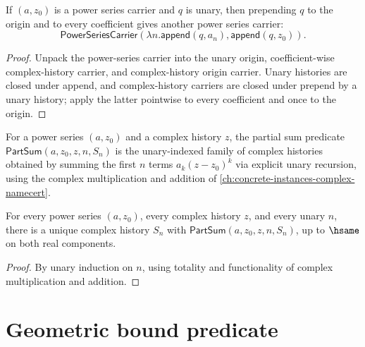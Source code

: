 \begin{lemma}
\label{thm:power-series-carrier-prepend-unary-closed}
If $(a,z_0)$ is a power series carrier and $q$ is unary, then prepending $q$ to
the origin and to every coefficient gives another power series carrier:
$$
\mathsf{PowerSeriesCarrier}(\lambda n.\mathsf{append}(q,a_n),\mathsf{append}(q,z_0)).
$$
\end{lemma}
\begin{proof}
Unpack the power-series carrier into the unary origin, coefficient-wise
complex-history carrier, and complex-history origin carrier. Unary histories
are closed under append, and complex-history carriers are closed under prepend
by a unary history; apply the latter pointwise to every coefficient and once
to the origin.
\end{proof}

\begin{definition}
\label{def:part-sum-power-series}
For a power series \((a, z_0)\) and a complex history \(z\), the partial sum predicate \(\mathsf{PartSum}(a, z_0, z, n, S_n)\) is the unary-indexed family of complex histories obtained by summing the first \(n\) terms \(a_k (z - z_0)^k\) via explicit unary recursion, using the complex multiplication and addition of \autoref{ch:concrete-instances-complex-namecert}.
\end{definition}

\begin{lemma}
\label{lem:part-sum-complex}
For every power series \((a, z_0)\), every complex history \(z\), and every unary \(n\), there is a unique complex history \(S_n\) with \(\mathsf{PartSum}(a, z_0, z, n, S_n)\), up to \(\hsame\) on both real components.
\end{lemma}
\begin{proof}
By unary induction on \(n\), using totality and functionality of complex multiplication and addition.
\end{proof}

\section{Geometric bound predicate}

